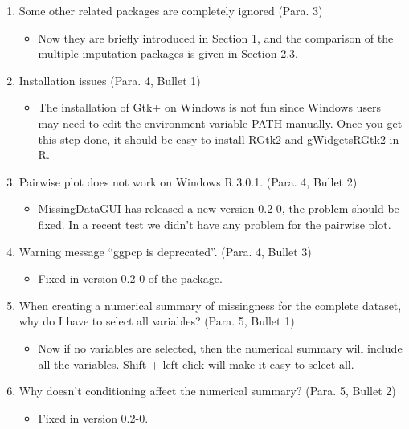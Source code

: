 \documentclass[12pt,english]{article}
\begin{document}
\begin{enumerate}
\item Some other related packages are completely ignored (Para. 3)
\begin{itemize}
\item Now they are briefly introduced in Section 1, and the comparison of
the multiple imputation packages is given in Section 2.3.
\end{itemize}

\item Installation issues (Para. 4, Bullet 1)
\begin{itemize}
\item The installation of Gtk+ on Windows is not fun since Windows users
may need to edit the environment variable PATH manually. Once you
get this step done, it should be easy to install RGtk2 and gWidgetsRGtk2
in R.
\end{itemize}

\item Pairwise plot does not work on Windows R 3.0.1. (Para. 4, Bullet 2)
\begin{itemize}
\item MissingDataGUI has released a new version 0.2-0, the problem should
be fixed. In a recent test we didn't have any problem for the pairwise plot.
\end{itemize}

\item Warning message ``ggpcp is deprecated''. (Para. 4, Bullet 3)
\begin{itemize}
\item Fixed in version 0.2-0 of the package.
\end{itemize}

\item When creating a numerical summary of missingness for the complete
dataset, why do I have to select all variables? (Para. 5, Bullet 1)
\begin{itemize}
\item Now if no variables are selected, then the numerical summary will
include all the variables. Shift + left-click will make it easy to
select all.
\end{itemize}

\item Why doesn\textquoteright{}t conditioning affect the numerical summary?
(Para. 5, Bullet 2)
\begin{itemize}
\item Fixed in version 0.2-0.
\end{itemize}


\end{enumerate}
\end{document}
